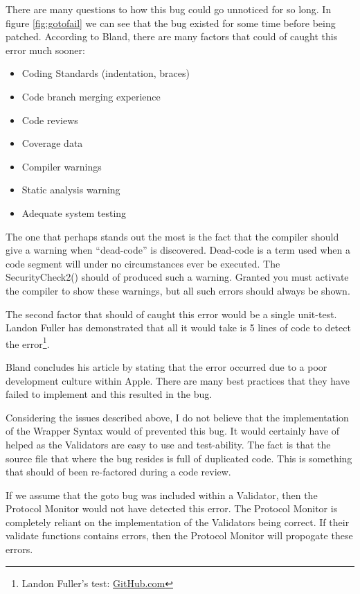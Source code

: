 There are many questions to how this bug could go unnoticed for so long. In figure \ref{fig:gotofail} we can see that the bug existed for some time before being patched. According to Bland, there are many factors that could of caught this error much sooner:
\begin{itemize}
  \item Coding Standards (indentation, braces)
  \item Code branch merging experience
  \item Code reviews
  \item Coverage data
  \item Compiler warnings
  \item Static analysis warning
  \item Adequate system testing
\end{itemize}

The one that perhaps stands out the most is the fact that the compiler should give a warning when ``dead-code'' is discovered. Dead-code is a term used when a code segment will under no circumstances ever be executed. The SecurityCheck2() should of produced such a warning. Granted you must activate the compiler to show these warnings, but all such errors should always be shown.

The second factor that should of caught this error would be a single unit-test. Landon Fuller has demonstrated that all it would take is 5 lines of code to detect the error\footnote{Landon Fuller's test: \href{https://github.com/landonf/Testability-CVE-2014-1266}{GitHub.com}}.

Bland concludes his article by stating that the error occurred due to a poor development culture within Apple. There are many best practices that they have failed to implement and this resulted in the bug.

Considering the issues described above, I do not believe that the implementation of the Wrapper Syntax would of prevented this bug. It would certainly have of helped as the Validators are easy to use and test-ability. The fact is that the source file that where the bug resides is full of duplicated code. This is something that should of been re-factored during a code review. 

If we assume that the goto bug was included within a Validator, then the Protocol Monitor would not have detected this error. The Protocol Monitor is completely reliant on the implementation of the Validators being correct. If their validate functions contains errors, then the Protocol Monitor will propogate these errors.

